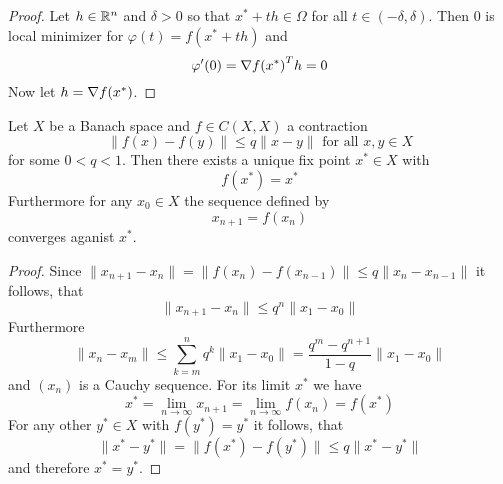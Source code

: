 \begin{proof}
Let \( h \in \mathbb{R}^n \) and \( \delta > 0 \) so that \( x^* + th \in \Omega \) for all \( t \in (-\delta, \delta) \). 
Then \( 0 \) is local minimizer for \( \varphi(t) = f(x^* + th) \) and
\[
    \varphi'(0) = {\nabla f(x^*)}^T h = 0
\]
Now let \( h = \nabla f(x^*) \). 
\end{proof}
\bigskip 


\begin{theorem}\label{thm:banach_fix_point}
Let \( X \) be a Banach space and \( f \in C(X,X) \) a contraction
\[
    \|f(x) - f(y)\| \le q \|x - y\| \text{ for all } x, y \in X
\]
for some \( 0 < q < 1 \). Then there exists a unique fix point \( x^* \in X \) with 
\[
     f(x^*) = x^*
\]
Furthermore for any \( x_0 \in X \) the sequence defined by
\[
     x_{n+1} = f(x_n)
\]
converges aganist \( x^* \).
\end{theorem}

\begin{proof}
Since \( \| x_{n+1} - x_n\| =\| f(x_n) - f(x_{n-1})\| \le q\| x_n - x_{n-1}\| \) it follows, that
\[ 
    \| x_{n+1} - x_n\| \le q^n  \|x_1 - x_0\| 
\] 
Furthermore
\[ 
    \| x_n - x_m\| \le \sum_{k=m}^n q^k \|x_1 - x_0\| = \frac{q^m - q^{n+1}}{1 - q} \|x_1 - x_0\| 
\] 
and \( (x_n) \) is a Cauchy sequence. For its limit \( x^* \) we have
\[ 
   x^* = \lim_{n\to\infty} x_{n+1} = \lim_{n\to\infty} f(x_n) = f(x^*)
\] 
For any other \( y^* \in X \) with \( f(y^*) = y^* \) it follows, that
\[
    \|x^* - y^*\| = \|f(x^*) - f(y^*)\| \le q \|x^* - y^*\|
\]
and therefore \( x^* = y^*\).

\end{proof}
\bigskip

